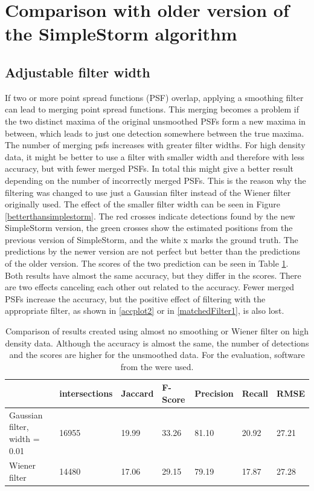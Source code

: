 \section{Comparison with older version of the SimpleStorm algorithm}
\subsection{Adjustable filter width} \label{sectionFilterisEvil}
If two or more point spread functions (PSF) overlap, applying a smoothing filter can lead to merging point spread functions. This merging becomes a problem if the two distinct maxima of the original unsmoothed PSFs form a new maxima in between, which leads to just one detection somewhere between the true maxima. The number of merging psfs increases with greater filter widths. For high density data, it might be better to use a filter with smaller width and therefore with less accuracy, but with fewer merged PSFs. In total this might give a better result depending on the number of incorrectly merged PSFs. This is the reason why the filtering was changed to use just a Gaussian filter instead of the Wiener filter originally used. 
The effect of the smaller filter width can be seen in Figure \ref{betterthansimplestorm}. The red crosses indicate detections found by the new SimpleStorm version, the green crosses show the estimated positions from the previous version of SimpleStorm, and the white x marks the ground truth. The predictions by the newer version are not perfect but better than the predictions of the older version. The scores of the two prediction can be seen in Table \ref{tabelbetterthansimplestorm}. Both results have almost the same accuracy, but they differ in the scores. There are two effects canceling each other out related to the accuracy. Fewer merged PSFs increase the accuracy, but the positive effect of filtering with the appropriate filter, as shown in \ref{accplot2} or in \ref{matchedFilter1}, is also lost. 

\begin{table}
\caption{Comparison of results created using almost no smoothing or Wiener filter on high density data. Although the accuracy is almost the same, the number of detections and the scores are higher for the unsmoothed data. For the evaluation, software from the \cite{challenge} were used.}
\begin{tabular}{l|llllll}
&intersections&Jaccard&F-Score&Precision&Recall&RMSE\\ \hline
Gaussian filter, width = 0.01& 16955&19.99&33.26&81.10&20.92&27.21\\
Wiener filter& 14480&17.06&29.15&79.19&17.87&27.28
\end{tabular} \label{tabelbetterthansimplestorm}

\end{table}


